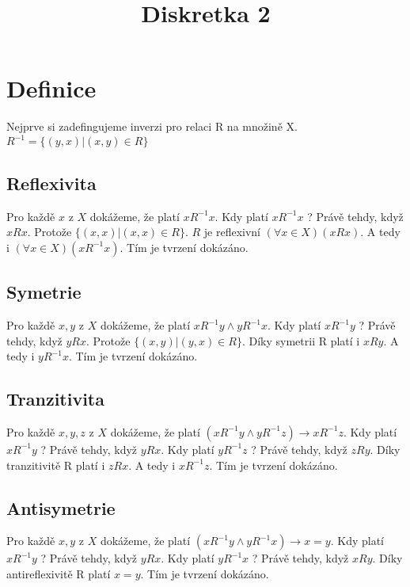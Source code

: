 \documentclass{article}
\title{Diskretka 2}
\begin{document}
\maketitle
\section{Definice}
Nejprve si zadefingujeme inverzi pro relaci R na množině X.\\
$R^{-1} = \{(y,x) | (x,y) \in R\}$\\
\subsection{Reflexivita}
Pro každě $x$ z $X$ dokážeme, že platí $xR^{-1}x$. Kdy platí $xR^{-1}x$ ? Právě tehdy, když $xRx$. Protože $\{(x,x) | (x,x) \in R\}$. $R$ je reflexivní \rightarrow $(\forall x \in X) (xRx)$. A tedy i $(\forall x \in X)( xR^{-1}x)$. Tím je tvrzení dokázáno.
\subsection{Symetrie}
Pro každě $x,y$ z $X$ dokážeme, že platí $xR^{-1}y \wedge yR^{-1}x$. Kdy platí $xR^{-1}y$ ? Právě tehdy, když $yRx$. Protože $\{(x,y) | (y,x) \in R\}$. Díky symetrii R platí i $xRy$. A tedy i $yR^{-1}x$. Tím je tvrzení dokázáno.

\subsection{Tranzitivita}
Pro každě $x,y,z$ z $X$ dokážeme, že platí $(xR^{-1}y \wedge yR^{-1}z) \rightarrow xR^{-1}z$. Kdy platí $xR^{-1}y$ ? Právě tehdy, když $yRx$. Kdy platí $yR^{-1}z$ ? Právě tehdy, když $zRy$. Díky tranzitivitě R platí i $zRx$. A tedy i $xR^{-1}z$. Tím je tvrzení dokázáno.

\subsection{Antisymetrie}
Pro každě $x,y$ z $X$ dokážeme, že platí $(xR^{-1}y \wedge yR^{-1}x) \rightarrow x = y$. Kdy platí $xR^{-1}y$ ? Právě tehdy, když $yRx$. Kdy platí $yR^{-1}x$ ? Právě tehdy, když $xRy$. Díky antireflexivitě R platí $x = y$. Tím je tvrzení dokázáno.
\end{document}

